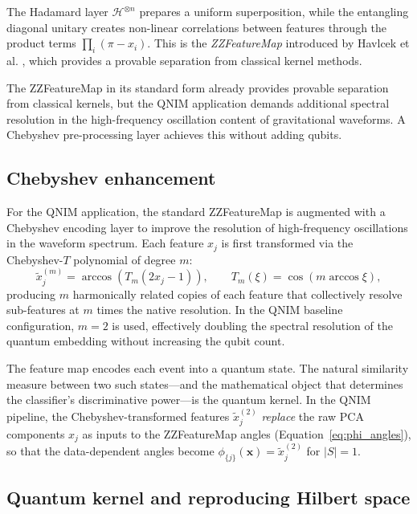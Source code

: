 \documentclass[11pt,a4paper, english]{book}
\theoremstyle{plain}
\theoremstyle{definition}
\numberwithin{equation}{chapter}
\numberwithin{figure}{chapter}
\numberwithin{table}{chapter}
\begin{document}
The Hadamard layer $\mathcal{H}^{\otimes n}$ prepares a uniform
superposition, while the entangling diagonal unitary creates non-linear
correlations between features through the product terms $\prod_i(\pi - x_i)$.
This is the \emph{ZZFeatureMap} introduced by Havlcek et al.
\cite{Havlicek_2019}, which provides a provable separation from classical
kernel methods.

The ZZFeatureMap in its standard form already provides provable separation from
classical kernels, but the QNIM application demands additional spectral resolution
in the high-frequency oscillation content of gravitational waveforms. A Chebyshev
pre-processing layer achieves this without adding qubits.

\subsection{Chebyshev enhancement}
\label{subsec:chebyshev}

For the QNIM application, the standard ZZFeatureMap is augmented with a
Chebyshev encoding layer to improve the resolution of high-frequency
oscillations in the waveform spectrum.  Each feature $x_j$ is first
transformed via the Chebyshev-$T$ polynomial of degree $m$:
\begin{equation}
  \label{eq:chebyshev}
  \tilde{x}_j^{(m)} = \arccos\!\left(T_m(2x_j - 1)\right),
  \qquad T_m(\xi) = \cos(m\arccos\xi),
\end{equation}
producing $m$ harmonically related copies of each feature that collectively
resolve sub-features at $m$ times the native resolution.  In the QNIM
baseline configuration, $m = 2$ is used, effectively doubling the spectral
resolution of the quantum embedding without increasing the qubit count.

The feature map encodes each event into a quantum state. The natural similarity
measure between two such states—and the mathematical object that determines the
classifier's discriminative power—is the quantum kernel.
In the QNIM pipeline, the Chebyshev-transformed features 
$\tilde{x}_j^{(2)}$ \emph{replace} the raw PCA components 
$x_j$ as inputs to the ZZFeatureMap angles 
(Equation~\ref{eq:phi_angles}), so that the data-dependent 
angles become $\phi_{\{j\}}(\mathbf{x}) = \tilde{x}_j^{(2)}$ 
for $|S|=1$.
\subsection{Quantum kernel and reproducing Hilbert space}
\label{subsec:quantum_kernel}
\end{document}
